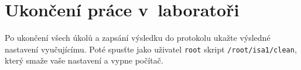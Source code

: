 \documentclass[a4paper,11pt]{article}
\begin{document}
\section{Ukončení práce v~laboratoři}
Po ukončení všech úkolů a zapsání výsledku do protokolu ukažte výsledné nastavení vyučujícímu. Poté spusťte jako uživatel {\tt root} skript {\tt /root/isa1/clean}, který smaže vaše nastavení a vypne počítač.
\end{document}
